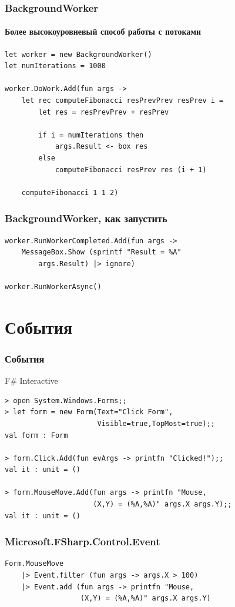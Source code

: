 \documentclass[xetex,mathserif,serif]{beamer}
\begin{document}
	\begin{frame}[fragile]
		\frametitle{BackgroundWorker}
		\framesubtitle{Более высокоуровневый способ работы с потоками}
		\begin{verbatim}
let worker = new BackgroundWorker()
let numIterations = 1000

worker.DoWork.Add(fun args ->
    let rec computeFibonacci resPrevPrev resPrev i =
        let res = resPrevPrev + resPrev
        
        if i = numIterations then
            args.Result <- box res
        else
            computeFibonacci resPrev res (i + 1)

    computeFibonacci 1 1 2)
		\end{verbatim}
\end{frame}

	\begin{frame}[fragile]
		\frametitle{BackgroundWorker, как запустить}
		\begin{verbatim}
worker.RunWorkerCompleted.Add(fun args ->
    MessageBox.Show (sprintf "Result = %A" 
        args.Result) |> ignore)

worker.RunWorkerAsync()
		\end{verbatim}
	\end{frame}

	\section{События}

	\begin{frame}[fragile]
		\frametitle{События}
		\begin{alertblock}{F\# Interactive}
			\begin{verbatim}
> open System.Windows.Forms;;
> let form = new Form(Text="Click Form",  
                      Visible=true,TopMost=true);;
val form : Form

> form.Click.Add(fun evArgs -> printfn "Clicked!");;
val it : unit = ()

> form.MouseMove.Add(fun args -> printfn "Mouse, 
                     (X,Y) = (%A,%A)" args.X args.Y);;
val it : unit = ()
			\end{verbatim}
		\end{alertblock}
\end{frame}

	\begin{frame}[fragile]
		\frametitle{Microsoft.FSharp.Control.Event}
		\begin{verbatim}
Form.MouseMove
    |> Event.filter (fun args -> args.X > 100)
    |> Event.add (fun args -> printfn "Mouse, 
                  (X,Y) = (%A,%A)" args.X args.Y)
		\end{verbatim}
	\end{frame}
\end{document}
